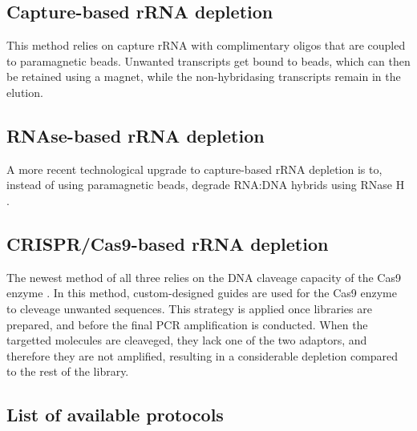 \documentclass[
]{book}
\begin{document}
\hypertarget{capture-based-rrna-depletion}{%
\subsection*{Capture-based rRNA depletion}\label{capture-based-rrna-depletion}}

This method relies on capture rRNA with complimentary oligos that are coupled to paramagnetic beads. Unwanted transcripts get bound to beads, which can then be retained using a magnet, while the non-hybridasing transcripts remain in the elution.

\hypertarget{rnase-based-rrna-depletion}{%
\subsection*{RNAse-based rRNA depletion}\label{rnase-based-rrna-depletion}}

A more recent technological upgrade to capture-based rRNA depletion is to, instead of using paramagnetic beads, degrade RNA:DNA hybrids using RNase H \citep{Huang2020-xf}.

\hypertarget{cas9-based-rrna-depletion}{%
\subsection*{CRISPR/Cas9-based rRNA depletion}\label{cas9-based-rrna-depletion}}

The newest method of all three relies on the DNA claveage capacity of the Cas9 enzyme \citep{Gu2016-yf}. In this method, custom-designed guides are used for the Cas9 enzyme to cleveage unwanted sequences. This strategy is applied once libraries are prepared, and before the final PCR amplification is conducted. When the targetted molecules are cleaveged, they lack one of the two adaptors, and therefore they are not amplified, resulting in a considerable depletion compared to the rest of the library.

\hypertarget{rrna-depletion-protocols}{%
\subsection*{List of available protocols}\label{rrna-depletion-protocols}}
\end{document}
